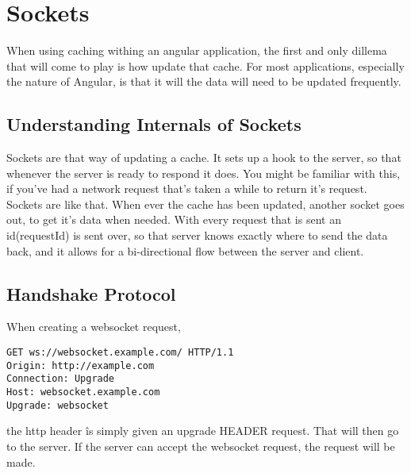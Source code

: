 \maketitle{}
\section{ Sockets }

When using caching withing an angular application, the first and only dillema
that will come to play is how update that cache. For most applications,
especially the nature of Angular, is that it will the data will need to be
updated frequently.

\subsection{ Understanding Internals of Sockets }
Sockets are that way of updating a cache. It sets up a hook
to the server, so that whenever the server is ready to respond it does. You
might be familiar with this, if you've had a network request that's taken a
while to return it's request. Sockets are like that. When ever the cache has
been updated, another socket goes out, to get it's data when needed. With
every request that is sent an id(requestId) is sent over, so that server knows
exactly where to send the data back, and it allows for a bi-directional flow
between the server and client.

\subsection{ Handshake Protocol }
When creating a websocket request,
\begin{verbatim}
GET ws://websocket.example.com/ HTTP/1.1
Origin: http://example.com
Connection: Upgrade
Host: websocket.example.com
Upgrade: websocket
\end{verbatim}

the http header \^ is simply given an upgrade HEADER request. That will then
go to the server. If the server can accept the websocket request, the request
will be made.
